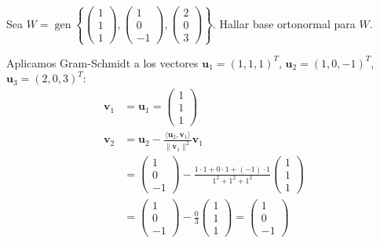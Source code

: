 \begin{example}
Sea $W = \operatorname{gen} \left\{ \begin{pmatrix} 1 \\ 1 \\ 1 \end{pmatrix}, \begin{pmatrix} 1 \\ 0 \\ -1 \end{pmatrix}, \begin{pmatrix} 2 \\ 0 \\ 3 \end{pmatrix} \right\}$. Hallar base ortonormal para $W$.
\end{example}

\begin{myproof}
Aplicamos Gram-Schmidt a los vectores $\mathbf{u}_1 = (1,1,1)^T$, $\mathbf{u}_2 = (1,0,-1)^T$, $\mathbf{u}_3 = (2,0,3)^T$:
\begin{align*}
\mathbf{v}_1 &= \mathbf{u}_1 = \begin{pmatrix} 1 \\ 1 \\ 1 \end{pmatrix} \\
\mathbf{v}_2 &= \mathbf{u}_2 - \frac{\langle \mathbf{u}_2, \mathbf{v}_1 \rangle}{\|\mathbf{v}_1\|^2} \mathbf{v}_1 \\
&= \begin{pmatrix} 1 \\ 0 \\ -1 \end{pmatrix} - \frac{1\cdot1 + 0\cdot1 + (-1)\cdot1}{1^2+1^2+1^2} \begin{pmatrix} 1 \\ 1 \\ 1 \end{pmatrix} \\
&= \begin{pmatrix} 1 \\ 0 \\ -1 \end{pmatrix} - \frac{0}{3} \begin{pmatrix} 1 \\ 1 \\ 1 \end{pmatrix} = \begin{pmatrix} 1 \\ 0 \\ -1 \end{pmatrix} \\

\end{align*}
\end{myproof}
